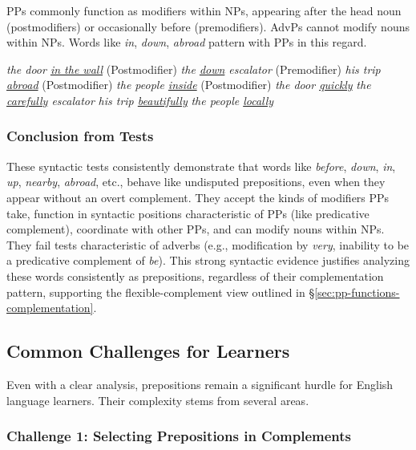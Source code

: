 PPs commonly function as modifiers within NPs, appearing after the head noun (postmodifiers) or occasionally before (premodifiers). AdvPs cannot modify nouns within NPs. Words like \textit{in}, \textit{down}, \textit{abroad} pattern with PPs in this regard.

\ea\label{ex:pp-np-mod} %
    \ea \textit{the {\ob}door \uline{in the wall}\cb} (Postmodifier)
    \ex \textit{the {\ob}\uline{down} escalator\cb} (Premodifier)
    \ex \textit{his {\ob}trip \uline{abroad}\cb} (Postmodifier)
    \ex \textit{the {\ob}people \uline{inside}\cb} (Postmodifier)
    \z
\z
\ea\label{ex:advp-np-mod} %
    \ea *\textit{the {\ob}door \uline{quickly}\cb}
    \ex *\textit{the {\ob}\uline{carefully} escalator\cb}
    \ex *\textit{his {\ob}trip \uline{beautifully}\cb}
    \ex *\textit{the {\ob}people \uline{locally}\cb}
    \z
\z

\subsubsection*{Conclusion from Tests}\label{sec:tests-conclusion}

These syntactic tests consistently demonstrate that words like \textit{before}, \textit{down}, \textit{in}, \textit{up}, \textit{nearby}, \textit{abroad}, etc., behave like undisputed prepositions, even when they appear without an overt complement. They accept the kinds of modifiers PPs take, function in syntactic positions characteristic of PPs (like predicative complement), coordinate with other PPs, and can modify nouns within NPs. They fail tests characteristic of adverbs (e.g., modification by \textit{very}, inability to be a predicative complement of \textit{be}). This strong syntactic evidence justifies analyzing these words consistently as prepositions, regardless of their complementation pattern, supporting the flexible-complement view outlined in \S\ref{sec:pp-functions-complementation}.

\subsection{Common Challenges for Learners}\label{sec:learner-challenges-preps}

Even with a clear analysis, prepositions remain a significant hurdle for English language learners. Their complexity stems from several areas.

\subsubsection*{Challenge 1: Selecting Prepositions in Complements}\label{sec:selecting-preps-challenge}

